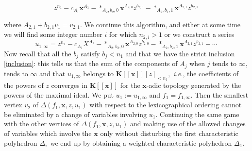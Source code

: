 \documentclass[11pt, a4paper]{amsart}
\numberwithin{equation}{section}
\theoremstyle{plain}
\theoremstyle{definition}
\theoremstyle{remark}
\newcommand{\K}{\mathbf{K}}
\newcommand{\0}{{\boldsymbol 0}}
\newcommand{\x}{{\boldsymbol x}}
\begin{document}
\begin{equation}
z^{n_1}-c_{A_1}\x^{A_1}-*_{A_2,b_2,0}\x^{A_{2,0}}z^{b_{2,0}}-*_{A_2,b_2,1}\x^{A_{2,1}}z^{b_{2,1}}
\end{equation}

where $A_{2,1}+b_{2,1}v_{1}=v_{2,1}.$
We continue this algorithm, and either at some time we will find some integer number $i$ for which $n_{2,i}>1$ or we construct a series 
\begin{equation}\label{converges}
u_{1,\infty}=z^{n_1}-c_{A_1}X^{A_1}-*_{A_2,b_2,0}\x^{A_{2,0}}z^{b_{2,0}}-*_{A_2,b_2,1}\x^{A_{2,1}}z^{b_{2,1}}-\cdots 
\end{equation}
Now recall that all the $b_j$ satisfy $b_j<n_1$ and that we have the strict inclusion \eqref{inclusion}: this tells us that the sum of the components of $A_j$ when $j$ tends to $\infty$, tends to $\infty$ and  that $u_{1,\infty}$ belongs to $\K[[\x]][z]_{<n_1},$ \textit{i.e.}, 
the coefficients of the powers of $z$ converges in $\K[[\x]]$ for the $\x$-adic topology generated by the powers of the maximal ideal. We put $u_1:=u_{1,\infty}$ and $f_1=f_{1,\infty}.$ Then the smallest vertex $v_{2}$ of $\Delta(f_{1},\x,z,u_{1})$ with respect to the lexicographical ordering cannot be eliminated by a change of variables involving $u_1.$ Continuing the same game with the other vertices of $\Delta(f_{1},\x,z,u_{1})$ and making use of the allowed changes of variables which involve the $\x$ only without disturbing the first characteristic polyhedron $\Delta,$ we end up by obtaining a weighted characteristic polyhedron  $\Delta_1.$   
\end{document}
